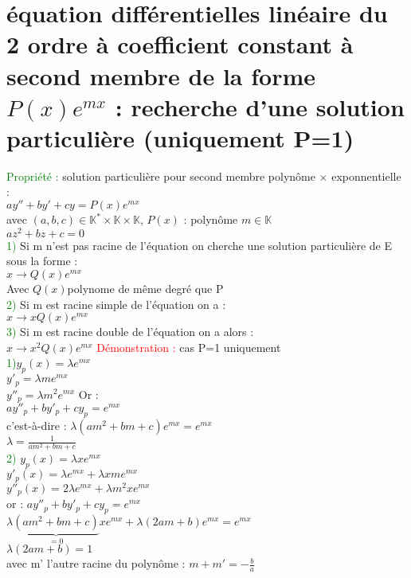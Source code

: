 \documentclass{article}
\begin{document}
	\section{équation différentielles linéaire du 2 ordre à coefficient constant à second membre de la forme $P(x)e^{mx}$ : recherche d'une solution particulière (uniquement P=1) }
	\textcolor{green}{Propriété :} solution particulière pour second membre polynôme $\times$ exponnentielle : \\ 
	$ay''+by'+cy=P(x)e^{mx}$ \\
	avec $(a,b,c)\in \mathbb{K}^* \times \mathbb{K} \times \mathbb{K}$, $P(x)$ : polynôme $m \in \mathbb{K}$ \\ 
	$az^2+bz+c=0$ \\ 
	\textcolor{green}{1)} Si m n'est pas racine de l'équation on cherche une solution particulière de E sous la forme : \\ 
	$x \rightarrow Q(x)e^{mx}$ \\ 
	Avec $Q(x)$polynome de même degré que P \\ 
	\textcolor{green}{2)} Si m est racine simple de l'équation on a : \\
	$x \rightarrow xQ(x)e^{mx}$ \\ 
	\textcolor{green}{3)} Si m est racine double de l'équation on a alors : \\ 
	$x \rightarrow x^2Q(x)e^{mx}$
	\textcolor{red}{Démonstration :} cas P=1 uniquement \\ 
	\textcolor{green}{1)}$y_p(x)= \lambda e^{mx}$ \\ 
	$y'_p= \lambda m e^{mx}$ \\ 
	$y''_p=\lambda m^2 e^{mx}$
	Or : \\ 
	$ay''_p+by'_p+cy_p=e^{mx}$ \\ 
	c'est-à-dire : $\lambda(am^2+bm+c)e^{mx}=e^{mx}$ \\ 
	$\lambda= \frac{1}{am^2+bm+c}$ \\ 
	\textcolor{green}{2)} $y_p(x)=\lambda x e^{mx}$ \\ 
	$y'_p(x)= \lambda e^{mx}+\lambda x me^{mx}$ \\ 
	$y''_p(x)=2\lambda e^{mx}+ \lambda m^2xe^{mx}$ \\ 
	or : $ay''_p+by'_p+cy_p=e^{mx}$ \\ 
	$\lambda \underbrace{(am^2+bm+c)}_{=0}xe^{mx}+ \lambda (2am+b)e^{mx}=e^{mx}$ \\
	$\lambda (2am +b)=1$ \\ 
	avec m' l'autre racine du polynôme :
	$m+m'=-\frac{b}{a}$ \\ 
\end{document}
